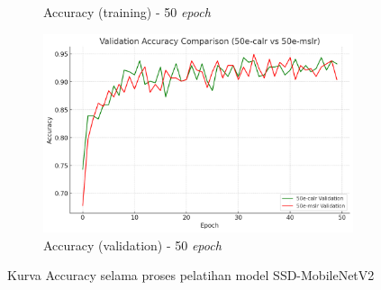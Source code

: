 \begin{figure}[htbp]
\begin{subfigure}{0.45\textwidth}
    \caption{Accuracy (training) - 50 \emph{epoch}}
  \end{subfigure}
  \hfill
  \begin{subfigure}{0.45\textwidth}
    \includegraphics[width=\textwidth]{gambar/bab4-val-acc-50e.png}
    \caption{Accuracy (validation) - 50 \emph{epoch}}
  \end{subfigure}
  \caption{Kurva Accuracy selama proses pelatihan model SSD-MobileNetV2}
  \label{fig:accuracy_curves}
\end{figure}

